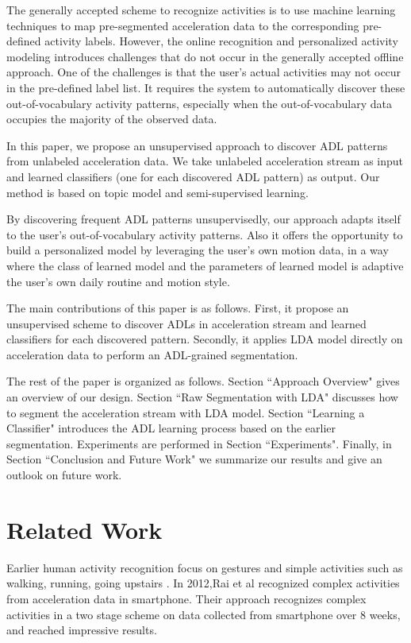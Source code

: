 \documentclass{sigchi}
\begin{document}
The generally accepted scheme to recognize activities is to use machine learning techniques to map pre-segmented acceleration data to the corresponding pre-defined activity labels. 
However, the online recognition and personalized activity modeling introduces challenges that do not occur in the generally accepted offline approach.
One of the challenges is that the user's actual activities may not occur in the pre-defined label list. It requires the system to automatically discover these out-of-vocabulary activity patterns, especially when the out-of-vocabulary data occupies the majority of the observed data.

In this paper, we propose an unsupervised approach to discover ADL patterns from unlabeled acceleration data.
We take unlabeled acceleration stream as input and learned classifiers (one for each discovered ADL pattern) as output. Our method is based on topic model and semi-supervised learning.

By discovering frequent ADL patterns unsupervisedly, our approach adapts itself to the user's out-of-vocabulary activity patterns. Also it offers the opportunity to build a personalized model by leveraging the user's own motion data, in a way where the class of learned model and the parameters of learned model is adaptive the user's own daily routine and motion style.

The main contributions of this paper is as follows.
First, it propose an unsupervised scheme to discover ADLs in acceleration stream and learned classifiers for each discovered pattern.
Secondly, it applies LDA model directly on acceleration data to perform an ADL-grained segmentation.

The rest of the paper is organized as follows.
Section ``Approach Overview" gives an overview of our design.
Section ``Raw Segmentation with LDA" discusses how to segment the acceleration stream with LDA model. Section ``Learning a Classifier" introduces the ADL learning process based on the earlier segmentation. Experiments are performed in Section ``Experiments".
Finally, in Section ``Conclusion and Future Work" we summarize our results and give an outlook on future work.


\section{Related Work}
\label{sec.related-work}

Earlier human activity recognition focus on gestures and simple activities such as walking, running, going upstairs \cite{kwapisz2011activity, liang1998real, mantyjarvi2001recognizing}.
In 2012,Rai et al \cite{rai2012mining} recognized complex activities from acceleration data in smartphone. Their approach recognizes complex activities in a two stage scheme on data collected from smartphone over 8 weeks, and reached impressive results.
\end{document}

